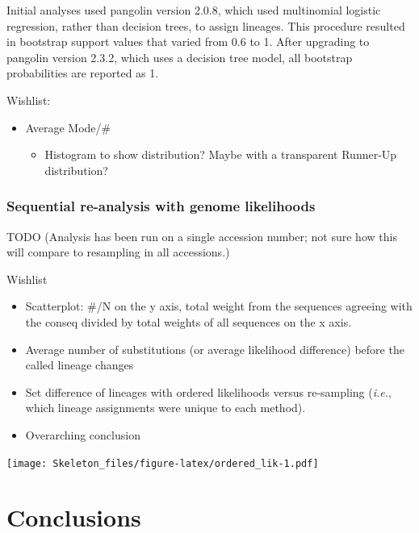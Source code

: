 \documentclass[
]{article}
\providecommand{\tightlist}{%
  \setlength{\itemsep}{0pt}\setlength{\parskip}{0pt}}
\newcommand{\ie}{\textit{i.e.},\xspace}
\begin{document}
Initial analyses used pangolin version 2.0.8, which used multinomial
logistic regression, rather than decision trees, to assign lineages.
This procedure resulted in bootstrap support values that varied from 0.6
to 1. After upgrading to pangolin version 2.3.2, which uses a decision
tree model, all bootstrap probabilities are reported as 1.

Wishlist:

\begin{itemize}
\tightlist
\item
  Average Mode/\#

  \begin{itemize}
  \tightlist
  \item
    Histogram to show distribution? Maybe with a transparent Runner-Up
    distribution?
  \end{itemize}
\end{itemize}

\hypertarget{sequential-re-analysis-with-genome-likelihoods}{%
\subsubsection{Sequential re-analysis with genome
likelihoods}\label{sequential-re-analysis-with-genome-likelihoods}}

TODO (Analysis has been run on a single accession number; not sure how
this will compare to resampling in all accessions.)

Wishlist

\begin{itemize}
\tightlist
\item
  Scatterplot: \#/N on the y axis, total weight from the sequences
  agreeing with the conseq divided by total weights of all sequences on
  the x axis.
\item
  Average number of substitutions (or average likelihood difference)
  before the called lineage changes
\item
  Set difference of lineages with ordered likelihoods versus re-sampling
  (\ie which lineage assignments were unique to each method).
\item
  Overarching conclusion
\end{itemize}

\texttt{[image: Skeleton\_files/figure-latex/ordered\_lik-1.pdf]}

\hypertarget{conclusions}{%
\section{Conclusions}\label{conclusions}}
\end{document}
